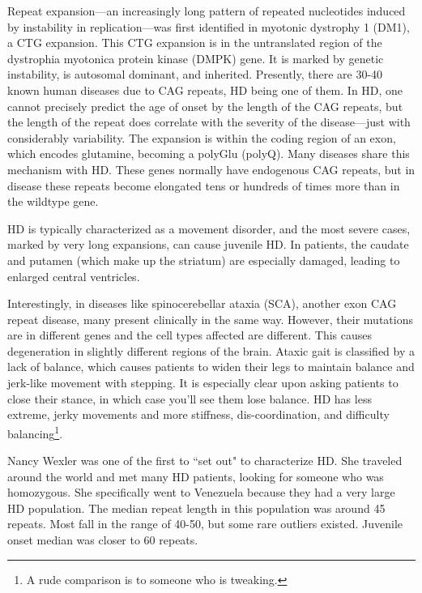 Repeat expansion---an increasingly long pattern of repeated nucleotides induced by instability in replication---was first identified in myotonic dystrophy 1 (DM1), a CTG expansion. This CTG expansion is in the untranslated region of the dystrophia myotonica protein kinase (DMPK) gene. It is marked by genetic instability, is autosomal dominant, and inherited. Presently, there are 30-40 known human diseases due to CAG repeats, HD being one of them. In HD, one cannot precisely predict the age of onset by the length of the CAG repeats, but the length of the repeat does correlate with the severity of the disease---just with considerably variability. The expansion is within the coding region of an exon, which encodes glutamine, becoming a polyGlu (polyQ). Many diseases share this mechanism with HD. These genes normally have endogenous CAG repeats, but in disease these repeats become elongated tens or hundreds of times more than in the wildtype gene.\newline

HD is typically characterized as a movement disorder, and the most severe cases, marked by very long expansions, can cause juvenile HD. In patients, the caudate and putamen (which make up the striatum) are especially damaged, leading to enlarged central ventricles. \newline

Interestingly, in diseases like spinocerebellar ataxia (SCA), another exon CAG repeat disease, many present clinically in the same way. However, their mutations are in different genes and the cell types affected are different. This causes degeneration in slightly different regions of the brain. Ataxic gait is classified by a lack of balance, which causes patients to widen their legs to maintain balance and jerk-like movement with stepping. It is especially clear upon asking patients to close their stance, in which case you'll see them lose balance. HD has less extreme, jerky movements and more stiffness, dis-coordination, and difficulty balancing\footnote{A rude comparison is to someone who is tweaking.}. \newline

Nancy Wexler was one of the first to ``set out" to characterize HD. She traveled around the world and met many HD patients, looking for someone who was homozygous. She specifically went to Venezuela because they had a very large HD population. The median repeat length in this population was around 45 repeats. Most fall in the range of 40-50, but some rare outliers existed. Juvenile onset median was closer to 60 repeats.\newline

